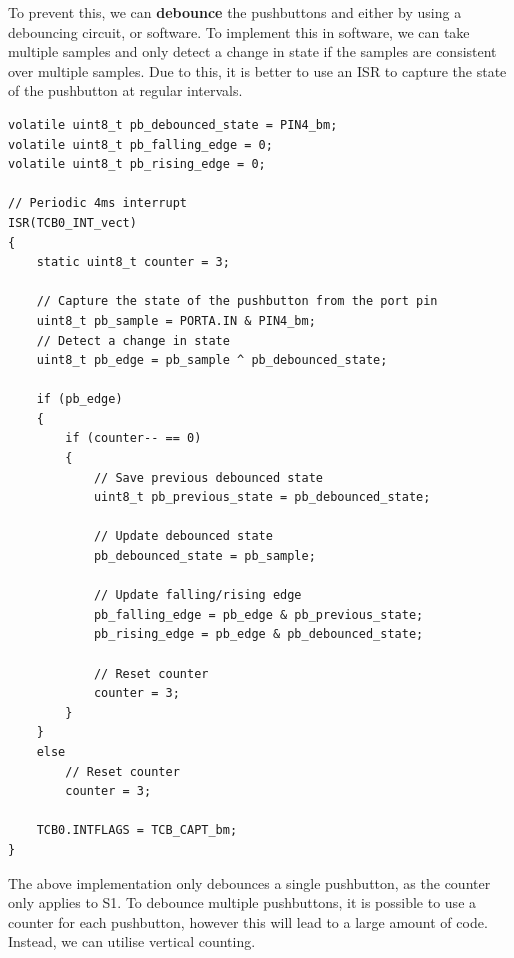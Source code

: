 \documentclass{report}
\begin{document}
To prevent this, we can \textbf{debounce} the pushbuttons and either by using a debouncing circuit, or software.
To implement this in software, we can take multiple samples and only detect a change in state if the samples are consistent
over multiple samples. Due to this, it is better to use an ISR to capture the state of the pushbutton at regular intervals.
\begin{verbatim}
volatile uint8_t pb_debounced_state = PIN4_bm;
volatile uint8_t pb_falling_edge = 0;
volatile uint8_t pb_rising_edge = 0;

// Periodic 4ms interrupt
ISR(TCB0_INT_vect)
{
    static uint8_t counter = 3;

    // Capture the state of the pushbutton from the port pin
    uint8_t pb_sample = PORTA.IN & PIN4_bm;
    // Detect a change in state
    uint8_t pb_edge = pb_sample ^ pb_debounced_state;

    if (pb_edge)
    {
        if (counter-- == 0)
        {
            // Save previous debounced state
            uint8_t pb_previous_state = pb_debounced_state;

            // Update debounced state
            pb_debounced_state = pb_sample;

            // Update falling/rising edge
            pb_falling_edge = pb_edge & pb_previous_state;
            pb_rising_edge = pb_edge & pb_debounced_state;

            // Reset counter
            counter = 3;
        }
    }
    else
        // Reset counter
        counter = 3;

    TCB0.INTFLAGS = TCB_CAPT_bm;
}
\end{verbatim}
The above implementation only debounces a single pushbutton, as the counter
only applies to S1. To debounce multiple pushbuttons, it is possible to
use a counter for each pushbutton, however this will lead to a large
amount of code. Instead, we can utilise vertical counting.
\end{document}
